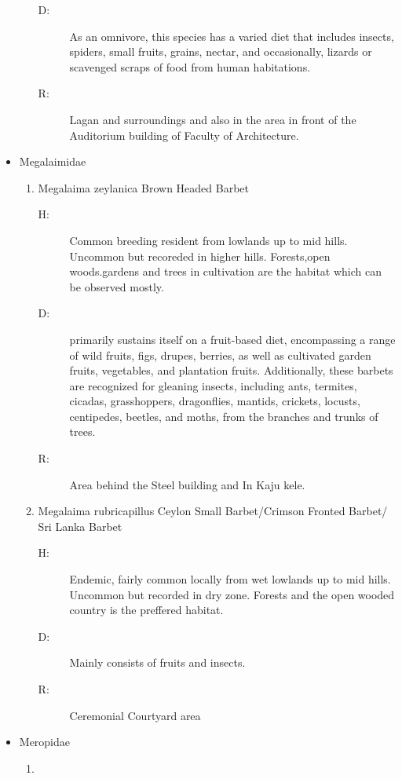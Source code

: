 \begin{itemize}
\begin{enumerate}
\begin{description}
\item[D: ]%
As an omnivore, this species has a varied diet that includes insects, spiders, small fruits, grains, nectar, and occasionally, lizards or scavenged scraps of food from human habitations.%
\item[R: ]%
Lagan and surroundings and also in the area in front of the Auditorium building of Faculty of Architecture.%
\end{description}%
\end{enumerate}%
\item%
Megalaimidae%
\begin{enumerate}%
\item%
Megalaima zeylanica\newline%
Brown Headed Barbet%
\begin{description}%
\item[H: ]%
Common breeding resident from lowlands up to mid hills. Uncommon but recoreded in higher hills. Forests,open woods.gardens and trees in cultivation are the habitat which can be observed mostly. %
\item[D: ]%
primarily sustains itself on a fruit{-}based diet, encompassing a range of wild fruits, figs, drupes, berries, as well as cultivated garden fruits, vegetables, and plantation fruits. Additionally, these barbets are recognized for gleaning insects, including ants, termites, cicadas, grasshoppers, dragonflies, mantids, crickets, locusts, centipedes, beetles, and moths, from the branches and trunks of trees.%
\item[R: ]%
Area behind the Steel building and In Kaju kele. %
\end{description}%
\item%
Megalaima rubricapillus\newline%
Ceylon Small Barbet/Crimson Fronted Barbet/ Sri Lanka Barbet%
\begin{description}%
\item[H: ]%
Endemic, fairly common locally from wet lowlands up to mid hills. Uncommon but recorded in dry zone. Forests and the open wooded country is the preffered habitat.%
\item[D: ]%
Mainly consists of fruits and insects.%
\item[R: ]%
Ceremonial Courtyard area%
\end{description}%
\end{enumerate}%
\item%
Meropidae%
\begin{enumerate}%
\item%

\end{enumerate}
\end{itemize}
